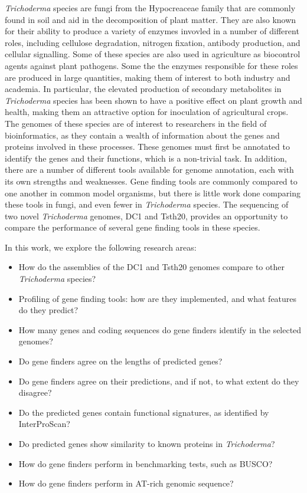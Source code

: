 \textit{Trichoderma} species are fungi from the Hypocreaceae family
 that are commonly found in soil and aid in the decomposition of plant matter.
 They are also known for their ability to produce a variety of enzymes invovled in a number of different roles, including cellulose degradation, nitrogen fixation, antibody production, and cellular signalling. Some of these species are also used in agriculture as biocontrol agents against plant pathogens. Some the the enzymes responsible for these roles are produced in large quantities, making them of interest to both industry and academia. In particular, the elevated production of secondary metabolites in \textit{Trichoderma} species has been shown to have a positive effect on plant growth and health, making them an attractive option for inoculation of agricultural crops. The genomes of these species are of interest to researchers in the field of bioinformatics, as they contain a wealth of information about the genes and proteins involved in these processes. These genomes must first be annotated to identify the genes and their functions, which is a non-trivial task. In addition, there are a number of different tools available for genome annotation, each with its own strengths and weaknesses. Gene finding tools are commonly compared to one another in common model organisms, but there is little work done comparing these tools in fungi, and even fewer in \textit{Trichoderma} species. The sequencing of two novel \textit{Trichoderma} genomes, DC1 and Tsth20, provides an opportunity to compare the performance of several gene finding tools in these species. 

 In this work, we explore the following research areas:
 \begin{itemize}
    \item How do the assemblies of the DC1 and Tsth20 genomes compare to other \textit{Trichoderma} species?
    \item Profiling of gene finding tools: how are they implemented, and what features do they predict?
    \item How many genes and coding sequences do gene finders identify in the selected genomes?
    \item Do gene finders agree on the lengths of predicted genes?
    \item Do gene finders agree on their predictions, and if not, to what extent do they disagree?
    \item Do the predicted genes contain functional signatures, as identified by InterProScan?
    \item Do predicted genes show similarity to known proteins in \textit{Trichoderma}?
    \item How do gene finders perform in benchmarking tests, such as BUSCO?
    \item How do gene finders perform in AT-rich genomic sequence?
 \end{itemize}

